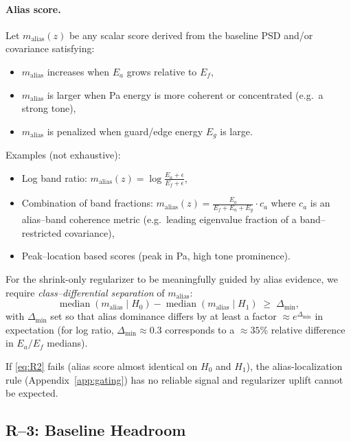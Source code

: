 \paragraph{Alias score.} Let $m_{\text{alias}}(z)$ be any scalar score derived from the baseline PSD and/or covariance satisfying:
\begin{itemize}[nosep]
  \item $m_{\text{alias}}$ increases when $E_a$ grows relative to $E_f$,
  \item $m_{\text{alias}}$ is larger when Pa energy is more coherent or concentrated (e.g.\ a strong tone),
  \item $m_{\text{alias}}$ is penalized when guard/edge energy $E_g$ is large.
\end{itemize}
Examples (not exhaustive):
\begin{itemize}[nosep]
  \item Log band ratio: $m_{\text{alias}}(z) = \log\frac{E_a+\epsilon}{E_f+\epsilon}$,
  \item Combination of band fractions: $m_{\text{alias}}(z) = \frac{E_a}{E_f+E_a+E_g} \cdot c_a$ where $c_a$ is an alias--band coherence metric (e.g.\ leading eigenvalue fraction of a band--restricted covariance),
  \item Peak--location based scores (peak in Pa, high tone prominence).
\end{itemize}

For the shrink-only regularizer to be meaningfully guided by alias evidence, we require \emph{class--differential separation} of $m_{\text{alias}}$:
\begin{equation}
\label{eq:R2}
\operatorname{median}\!\left(m_{\text{alias}}\mid H_0\right) - \operatorname{median}\!\left(m_{\text{alias}}\mid H_1\right) \;\ge\; \Delta_{\min},
\end{equation}
with $\Delta_{\min}$ set so that alias dominance differs by at least a factor $\approx e^{\Delta_{\min}}$ in expectation (for log ratio, $\Delta_{\min}\approx 0.3$ corresponds to a $\approx 35\%$ relative difference in $E_a/E_f$ medians).

If \eqref{eq:R2} fails (alias score almost identical on $H_0$ and $H_1$), the alias-localization rule (Appendix~\ref{app:gating}) has no reliable signal and regularizer uplift cannot be expected.

\subsection{R--3: Baseline Headroom}

